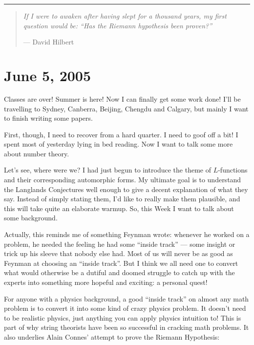 \documentclass{article}
\begin{document}
\begin{center}\rule{0.5\linewidth}{0.5pt}\end{center}

\begin{quote}
\emph{If I were to awaken after having slept for a thousand years, my
first question would be: ``Has the Riemann hypothesis been proven?''}

--- David Hilbert
\end{quote}



\hypertarget{week218}{%
\section{June 5, 2005}\label{week218}}

Classes are over! Summer is here! Now I can finally get some work done!
I'll be travelling to Sydney, Canberra, Beijing, Chengdu and Calgary,
but mainly I want to finish writing some papers.

First, though, I need to recover from a hard quarter. I need to goof off
a bit! I spent most of yesterday lying in bed reading. Now I want to
talk some more about number theory.

Let's see, where were we? I had just begun to introduce the theme of
\(L\)-functions and their corresponding automorphic forms. My ultimate
goal is to understand the Langlands Conjectures well enough to give a
decent explanation of what they say. Instead of simply stating them, I'd
like to really make them plausible, and this will take quite an
elaborate warmup. So, this Week I want to talk about some background.

Actually, this reminds me of something Feynman wrote: whenever he worked
on a problem, he needed the feeling he had some ``inside track'' ---
some insight or trick up his sleeve that nobody else had. Most of us
will never be as good as Feynman at choosing an ``inside track''. But I
think we all need one to convert what would otherwise be a dutiful and
doomed struggle to catch up with the experts into something more hopeful
and exciting: a personal quest!

For anyone with a physics background, a good ``inside track'' on almost
any math problem is to convert it into some kind of crazy physics
problem. It doesn't need to be realistic physics, just anything you can
apply physics intuition to! This is part of why string theorists have
been so successful in cracking math problems. It also underlies Alain
Connes' attempt to prove the Riemann Hypothesis:
\end{document}

